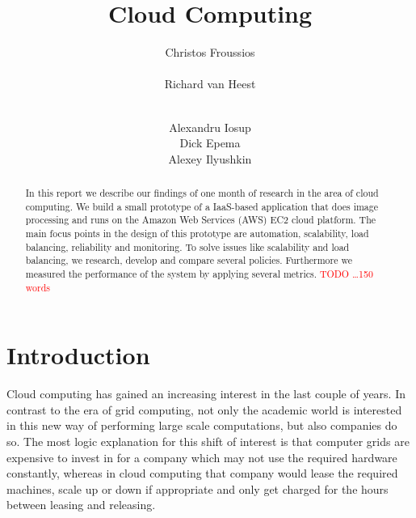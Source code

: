 \documentclass{stylesheet}
\begin{document}
\title{Cloud Computing}

\author{
\alignauthor
Christos Froussios\\
	\\
\alignauthor
Richard van Heest\\
	\\
\and
\alignauthor
Alexandru Iosup\\
\alignauthor
Dick Epema\\
\alignauthor
Alexey Ilyushkin\\
}

\maketitle

\begin{abstract}
In this report we describe our findings of one month of research in the area of cloud computing. We build a small prototype of a IaaS-based application that does image processing and runs on the Amazon Web Services (AWS) EC2 cloud platform. The main focus points in the design of this prototype are automation, scalability, load balancing, reliability and monitoring. To solve issues like scalability and load balancing, we research, develop and compare several policies. Furthermore we measured the performance of the system by applying several metrics. \textcolor{red}{TODO \ldots 150 words}
\end{abstract}

\section{Introduction}
Cloud computing has gained an increasing interest in the last couple of years. In contrast to the era of grid computing, not only the academic world is interested in this new way of performing large scale computations, but also companies do so. The most logic explanation for this shift of interest is that computer grids are expensive to invest in for a company which may not use the required hardware constantly, whereas in cloud computing that company would lease the required machines, scale up or down if appropriate and only get charged for the hours between leasing and releasing.
\end{document}

